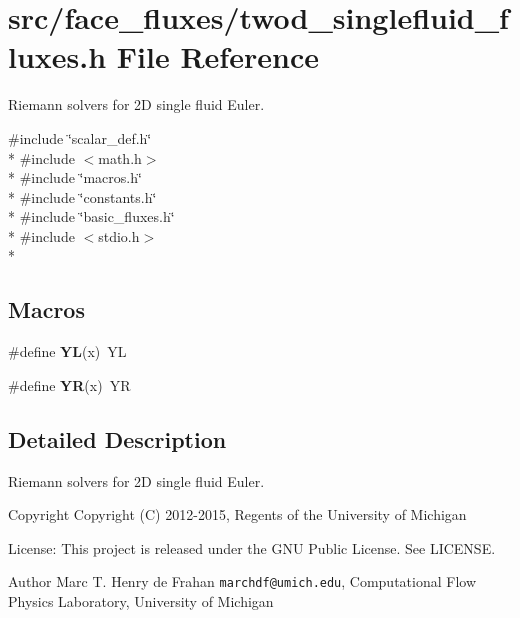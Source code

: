 \section{src/face\-\_\-fluxes/twod\-\_\-singlefluid\-\_\-fluxes.h File Reference}
\label{twod__singlefluid__fluxes_8h}


Riemann solvers for 2\-D single fluid Euler.  


{\ttfamily \#include \char`\"{}scalar\-\_\-def.\-h\char`\"{}}\\*
{\ttfamily \#include $<$math.\-h$>$}\\*
{\ttfamily \#include \char`\"{}macros.\-h\char`\"{}}\\*
{\ttfamily \#include \char`\"{}constants.\-h\char`\"{}}\\*
{\ttfamily \#include \char`\"{}basic\-\_\-fluxes.\-h\char`\"{}}\\*
{\ttfamily \#include $<$stdio.\-h$>$}\\*
\subsection*{Macros}
\begin{DoxyCompactItemize}
\item 
\#define {\bfseries Y\-L}(x)~Y\-L\label{twod__singlefluid__fluxes_8h_a77cb2523048b3756423bcc1051e4f30c}

\item 
\#define {\bfseries Y\-R}(x)~Y\-R\label{twod__singlefluid__fluxes_8h_ac574c67246847dfb54604debb74f7e95}

\end{DoxyCompactItemize}


\subsection{Detailed Description}
Riemann solvers for 2\-D single fluid Euler. \begin{DoxyCopyright}{Copyright}
Copyright (C) 2012-\/2015, Regents of the University of Michigan 
\end{DoxyCopyright}
\begin{DoxyParagraph}{License\-:}
This project is released under the G\-N\-U Public License. See L\-I\-C\-E\-N\-S\-E. 
\end{DoxyParagraph}
\begin{DoxyAuthor}{Author}
Marc T. Henry de Frahan {\tt marchdf@umich.\-edu}, Computational Flow Physics Laboratory, University of Michigan 
\end{DoxyAuthor}
